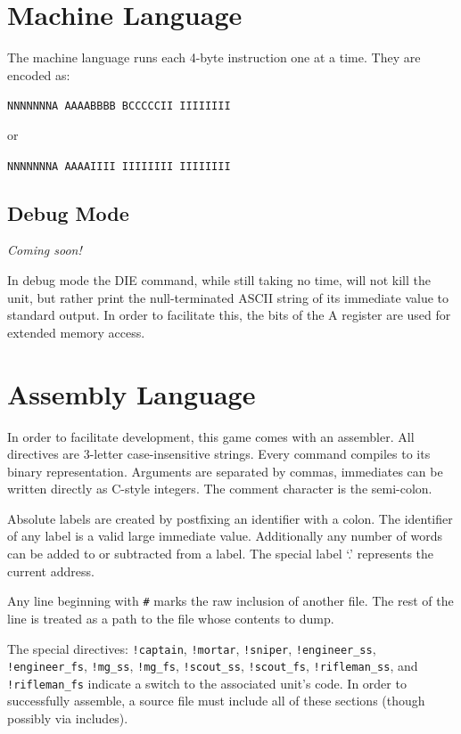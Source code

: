 \documentclass{article}
\begin{document}
\section*{Machine Language}

The machine language runs each 4-byte instruction one at a time. They are
encoded as:

\texttt{NNNNNNNA AAAABBBB BCCCCCII IIIIIIII}

or

\texttt{NNNNNNNA AAAAIIII IIIIIIII IIIIIIII}

\subsection*{Debug Mode}

\textit{Coming soon!}

In debug mode the DIE command, while still taking no time, will not kill the
unit, but rather print the null-terminated ASCII string of its immediate value
to standard output. In order to facilitate this, the bits of the A register are
used for extended memory access.

\section*{Assembly Language}

In order to facilitate development, this game comes with an assembler. All
directives are 3-letter case-insensitive strings. Every command compiles to its
binary representation. Arguments are separated by commas, immediates can be
written directly as C-style integers.  The comment character is the semi-colon.

Absolute labels are created by postfixing an identifier with a colon. The
identifier of any label is a valid large immediate value. Additionally any
number of words can be added to or subtracted from a label. The special label
`.' represents the current address.

Any line beginning with \verb|#| marks the raw inclusion of another file. The
rest of the line is treated as a path to the file whose contents to dump.

The special directives: \texttt{!captain}, \texttt{!mortar}, \texttt{!sniper},
\texttt{!engineer\_ss}, \texttt{!engineer\_fs}, \texttt{!mg\_ss},
\texttt{!mg\_fs}, \texttt{!scout\_ss}, \texttt{!scout\_fs},
\texttt{!rifleman\_ss}, and \texttt{!rifleman\_fs} indicate a switch to the
associated unit's code. In order to successfully assemble, a source file must
include all of these sections (though possibly via includes).
\end{document}
